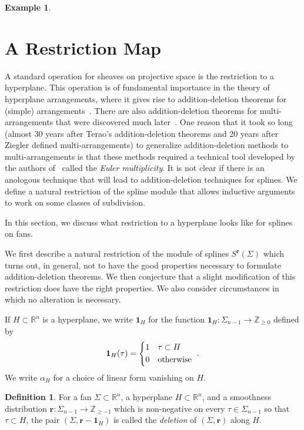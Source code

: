 \documentclass[11pt, reqno]{amsart}
\newcommand{\RR}{\mathbb{R}}
\newcommand{\R}{\mathbb{R}}
\newcommand{\ZZ}{\mathbb{Z}}
\newcommand{\br}{\mathbf{r}}
\theoremstyle{definition}
\newtheorem{definition}[theorem]{Definition}
\newtheorem{example}[theorem]{Example}
\theoremstyle{remark}
\numberwithin{equation}{section}
\begin{document}
\begin{example}

\end{example}


\section{A Restriction Map}

A standard operation for sheaves on projective space is the restriction to a hyperplane.  This operation is of fundamental importance in the theory of hyperplane arrangements, where it gives rise to addition-deletion theorems for (simple) arrangements~\cite{Terao-Arrangements-of-hyperplanes-I,Terao-Arrangements-of-hyperplanes-II}.  There are also addition-deletion theorems for multi-arrangements that were discovered much later~\cite{Abe-Terao-Wakefield-Euler-2008}.  One reason that it took so long (almost 30 years after Terao's addition-deletion theorems and 20 years after Ziegler defined multi-arrangements) to generalize addition-deletion methods to multi-arrangements is that these methods required a technical tool developed by the authors of~\cite{Abe-Terao-Wakefield-Euler-2008} called the \textit{Euler multiplicity}.  It is not clear if there is an anologous technique that will lead to addition-deletion techniques for splines.  We define a natural restriction of the spline module that allows inductive arguments to work on some classes of subdivision.

In this section, we discuss what restriction to a hyperplane looks like for splines on fans.

We first describe a natural restriction of the module of splines $S^{\br}(\Sigma)$ which turns out, in general, not to have the good properties necessary to formulate addition-deletion theorems.  We then conjecture that a slight modification of this restriction does have the right properties.  We also consider circumstances in which no alteration is necessary.

If $H\subset\R^n$ is a hyperplane, we write $\mathbf{1}_H$ for the function $\mathbf{1}_H: \Sigma_{n-1}\to\ZZ_{\ge 0}$ defined by
\[
\mathbf{1}_H(\tau)=
\begin{cases*}
1 & $\tau\subset H$\\
0 &\mbox{otherwise}
\end{cases*}.
\]
We write $\alpha_H$ for a choice of linear form vanishing on $H$.

\begin{definition}
For a fan $\Sigma\subset\RR^n$, a hyperplane $H\subset\RR^n$, and a smoothness distribution $\br:\Sigma_{n-1}\to \ZZ_{\ge -1}$ which is non-negative on every $\tau\in\Sigma_{n-1}$ so that $\tau\subset H$, the pair $(\Sigma,\br-\mathbf{1}_{H})$ is called the \textit{deletion} of $(\Sigma,\br)$ along $H$.
\end{definition}
\end{document}

